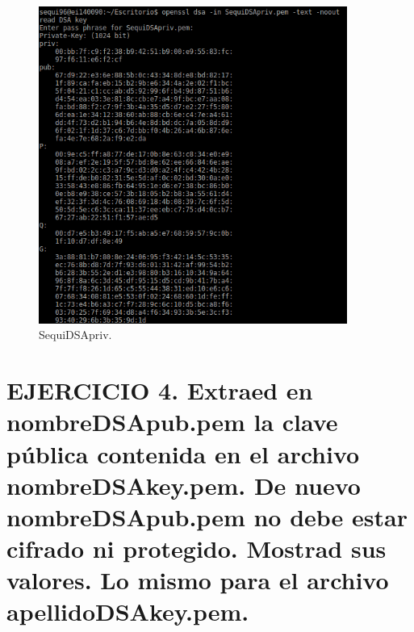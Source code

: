 \begin{figure}[h]
	\centering
	\includegraphics[width=0.9\textwidth]{imagenes/SequiDSApriv}
	\caption{SequiDSApriv.}
\end{figure}










\section{EJERCICIO 4. Extraed en nombreDSApub.pem la clave pública contenida en el archivo nombreDSAkey.pem. De nuevo nombreDSApub.pem no debe estar cifrado ni protegido. Mostrad sus valores. Lo mismo para el archivo apellidoDSAkey.pem. }

